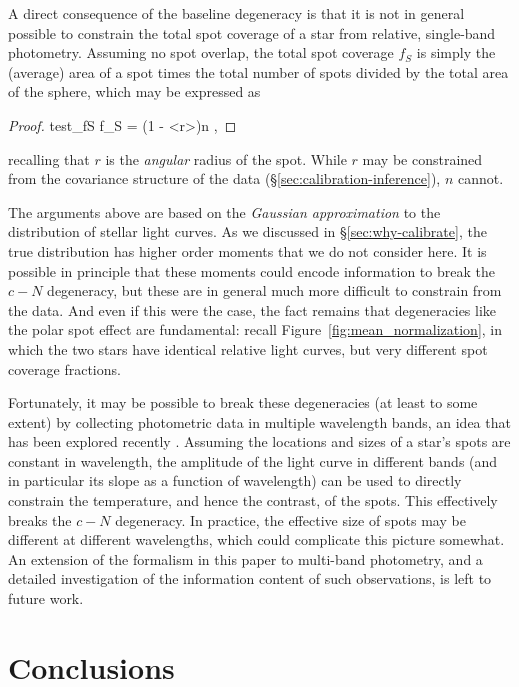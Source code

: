 \documentclass[modern]{aastex62}
\begin{document}
A direct consequence of the baseline degeneracy is that it is not in general
possible to constrain the total spot coverage of a star from relative,
single-band photometry. Assuming no spot overlap, the total spot coverage $f_S$ is simply the (average) area of a spot
times the total number of spots divided by the total area of the sphere, which
may be expressed as
%
\begin{proof}{test_fS}
    \label{eq:fS}
    f_S = \left(1 - \left<\cos r\right>\right)n
    \quad,
\end{proof}
%
recalling that $r$ is the \emph{angular} radius of the spot.
While $r$ may be constrained from the covariance structure of the data
(\S\ref{sec:calibration-inference}), $n$ cannot.

The arguments above are based on the \emph{Gaussian approximation} to the
distribution of stellar light curves. As we discussed in \S\ref{sec:why-calibrate},
the true distribution has higher order moments that we do not consider here.
It is possible in principle that these moments could encode information to
break the $c-N$ degeneracy, but these are in general much more difficult
to constrain from the data. And even if this were the case, the fact remains
that degeneracies like the polar spot effect are fundamental: recall
Figure~\ref{fig:mean_normalization}, in which the two stars
have identical relative light curves, but very different spot coverage
fractions.

Fortunately, it may be possible to break these degeneracies (at least to some extent)
by collecting photometric data in multiple wavelength bands, an idea that has
been explored recently \citep[e.g.,][]{Gully2017,Guo2018}. Assuming the
locations and sizes of a star's spots are constant in wavelength, the amplitude
of the light curve in different bands (and in particular its slope as a function
of wavelength) can be used to directly constrain the
temperature, and hence the contrast, of the spots. This effectively breaks the
$c-N$ degeneracy. In practice, the effective size of spots may be different
at different wavelengths, which could complicate this picture somewhat. An extension
of the formalism in this paper to multi-band photometry, and a detailed investigation
of the information content of such observations, is left to future work.

\section{Conclusions}



\end{document}
